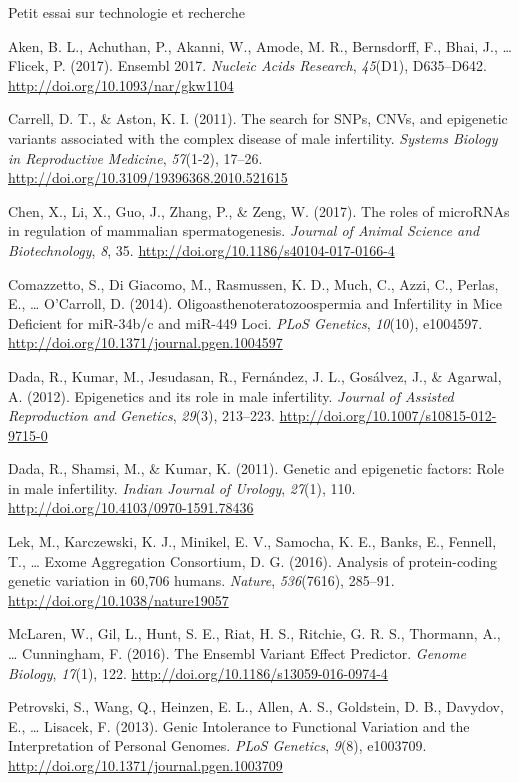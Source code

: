 \documentclass[12pt,twoside]{reedthesis}
\theoremstyle{definition}
\theoremstyle{definition}
\theoremstyle{remark}
\begin{document}
  \newpage
  
  Petit essai sur technologie et recherche
  
  \hypertarget{refs}{}
  \hypertarget{ref-Aken2017}{}
  Aken, B. L., Achuthan, P., Akanni, W., Amode, M. R., Bernsdorff, F.,
  Bhai, J., \ldots{} Flicek, P. (2017). Ensembl 2017. \emph{Nucleic Acids
  Research}, \emph{45}(D1), D635--D642.
  \url{http://doi.org/10.1093/nar/gkw1104}
  
  \hypertarget{ref-Carrell2011}{}
  Carrell, D. T., \& Aston, K. I. (2011). The search for SNPs, CNVs, and
  epigenetic variants associated with the complex disease of male
  infertility. \emph{Systems Biology in Reproductive Medicine},
  \emph{57}(1-2), 17--26.
  \url{http://doi.org/10.3109/19396368.2010.521615}
  
  \hypertarget{ref-Chen2017}{}
  Chen, X., Li, X., Guo, J., Zhang, P., \& Zeng, W. (2017). The roles of
  microRNAs in regulation of mammalian spermatogenesis. \emph{Journal of
  Animal Science and Biotechnology}, \emph{8}, 35.
  \url{http://doi.org/10.1186/s40104-017-0166-4}
  
  \hypertarget{ref-Comazzetto2014}{}
  Comazzetto, S., Di Giacomo, M., Rasmussen, K. D., Much, C., Azzi, C.,
  Perlas, E., \ldots{} O'Carroll, D. (2014). Oligoasthenoteratozoospermia
  and Infertility in Mice Deficient for miR-34b/c and miR-449 Loci.
  \emph{PLoS Genetics}, \emph{10}(10), e1004597.
  \url{http://doi.org/10.1371/journal.pgen.1004597}
  
  \hypertarget{ref-Dada2012}{}
  Dada, R., Kumar, M., Jesudasan, R., Fernández, J. L., Gosálvez, J., \&
  Agarwal, A. (2012). Epigenetics and its role in male infertility.
  \emph{Journal of Assisted Reproduction and Genetics}, \emph{29}(3),
  213--223. \url{http://doi.org/10.1007/s10815-012-9715-0}
  
  \hypertarget{ref-Dada2011}{}
  Dada, R., Shamsi, M., \& Kumar, K. (2011). Genetic and epigenetic
  factors: Role in male infertility. \emph{Indian Journal of Urology},
  \emph{27}(1), 110. \url{http://doi.org/10.4103/0970-1591.78436}
  
  \hypertarget{ref-Lek2016}{}
  Lek, M., Karczewski, K. J., Minikel, E. V., Samocha, K. E., Banks, E.,
  Fennell, T., \ldots{} Exome Aggregation Consortium, D. G. (2016).
  Analysis of protein-coding genetic variation in 60,706 humans.
  \emph{Nature}, \emph{536}(7616), 285--91.
  \url{http://doi.org/10.1038/nature19057}
  
  \hypertarget{ref-McLaren2016}{}
  McLaren, W., Gil, L., Hunt, S. E., Riat, H. S., Ritchie, G. R. S.,
  Thormann, A., \ldots{} Cunningham, F. (2016). The Ensembl Variant Effect
  Predictor. \emph{Genome Biology}, \emph{17}(1), 122.
  \url{http://doi.org/10.1186/s13059-016-0974-4}
  
  \hypertarget{ref-Petrovski2013}{}
  Petrovski, S., Wang, Q., Heinzen, E. L., Allen, A. S., Goldstein, D. B.,
  Davydov, E., \ldots{} Lisacek, F. (2013). Genic Intolerance to
  Functional Variation and the Interpretation of Personal Genomes.
  \emph{PLoS Genetics}, \emph{9}(8), e1003709.
  \url{http://doi.org/10.1371/journal.pgen.1003709}


\end{document}

